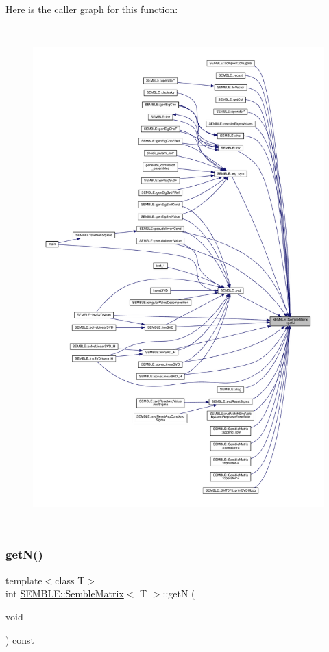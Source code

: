 Here is the caller graph for this function\+:
\nopagebreak
\begin{figure}[H]
\begin{center}
\leavevmode
\includegraphics[height=550pt]{df/d87/structSEMBLE_1_1SembleMatrix_a08e062d74d9de22f303e1ab957eb77f2_icgraph}
\end{center}
\end{figure}
\mbox{\label{structSEMBLE_1_1SembleMatrix_a08e062d74d9de22f303e1ab957eb77f2}} 
\subsubsection{\texorpdfstring{getN()}{getN()}\hspace{0.1cm}{\footnotesize\ttfamily [2/2]}}
{\footnotesize\ttfamily template$<$class T$>$ \\
int \mbox{\hyperlink{structSEMBLE_1_1SembleMatrix}{S\+E\+M\+B\+L\+E\+::\+Semble\+Matrix}}$<$ T $>$\+::getN (\begin{DoxyParamCaption}\item[{void}]{ }\end{DoxyParamCaption}) const\hspace{0.3cm}{\ttfamily [inline]}}


